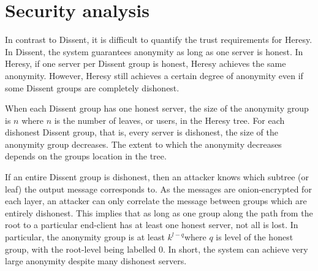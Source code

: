 \section{Security analysis}
\label{sec:sec-analysis}
In contrast to Dissent, it is difficult to quantify the trust requirements for Heresy. In Dissent, the system guarantees anonymity as long as one server is honest. In Heresy, if one server per Dissent group is honest, Heresy achieves the same anonymity. However, Heresy still achieves a certain degree of anonymity even if some Dissent groups are completely dishonest.

When each Dissent group has one honest server, the size of the anonymity group is $n$ where $n$ is the number of leaves, or users, in the Heresy tree. For each dishonest Dissent group, that is, every server is dishonest, the size of the anonymity group decreases. The extent to which the anonymity decreases depends on the groups location in the tree. 

If an entire Dissent group is dishonest, then an attacker knows which subtree (or leaf) the output message corresponds to. As the messages are onion-encrypted for each layer, an attacker can only correlate the message between groups which are entirely dishonest. This implies that as long as one group along the path from the root to a particular end-client has at least one honest server, not all is lost. In particular, the anonymity group is at least $k^{l-q}$where $q$ is level of the honest group, with the root-level being labelled 0. In short, the system can achieve very large anonymity despite many dishonest servers. 
